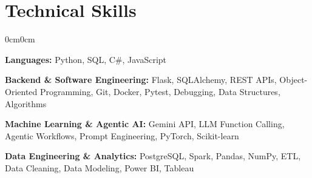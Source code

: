 \documentclass[10pt, letterpaper]{article}
\newenvironment{onecolentry}{
    \begin{adjustwidth}{0cm}{0cm}
}{
    \end{adjustwidth}
}
\begin{document}
\section{Technical Skills}

\begin{onecolentry}
    \textbf{Languages:} Python, SQL, C\#, JavaScript

    \vspace{1pt}

    \textbf{Backend \& Software Engineering:}
    Flask, SQLAlchemy, REST APIs, Object-Oriented Programming, Git, Docker,
    Pytest, Debugging, Data Structures, Algorithms

    \vspace{1pt}

    \textbf{Machine Learning \& Agentic AI:}
    Gemini API, LLM Function Calling, Agentic Workflows, Prompt Engineering,
    PyTorch, Scikit-learn

    \vspace{1pt}

    \textbf{Data Engineering \& Analytics:}
    PostgreSQL, Spark, Pandas, NumPy, ETL, Data Cleaning, Data Modeling,
    Power BI, Tableau
\end{onecolentry}
\end{document}
